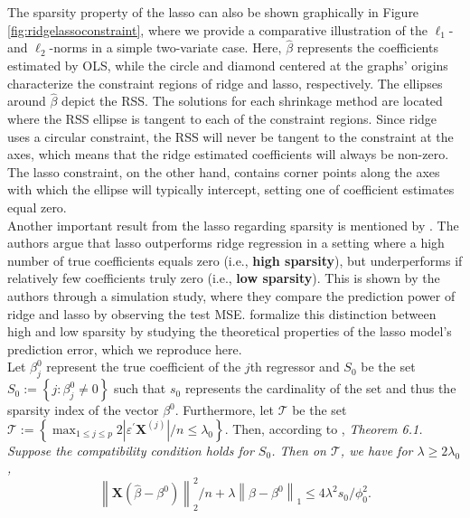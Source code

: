 \noindent The sparsity property of the lasso can also be shown graphically in Figure \ref{fig:ridgelassoconstraint}, where we provide a comparative illustration of the $\ell_1$- and $\ell_2$-norms in a simple two-variate case. Here, $\hat{\beta}$ represents the coefficients estimated by OLS, while the circle and diamond centered at the graphs' origins characterize the constraint regions of ridge and lasso, respectively. The ellipses around $\hat{\beta}$ depict the RSS. The solutions for each shrinkage method are located where the RSS ellipse is tangent to each of the constraint regions. Since ridge uses a circular constraint, the RSS will never be tangent to the constraint at the axes, which means that the ridge estimated coefficients will always be non-zero. The lasso constraint, on the other hand, contains corner points along the axes with which the ellipse will typically intercept, setting one of coefficient estimates equal zero. \\

\noindent Another important result from the lasso regarding sparsity is mentioned by \cite{james2013introduction}. The authors argue that lasso outperforms ridge regression in a setting where a high number of true coefficients equals zero (i.e., \textbf{high sparsity}), but underperforms if relatively few coefficients truly zero (i.e., \textbf{low sparsity}). This is shown by the authors through a simulation study, where they compare the prediction power of ridge and lasso by observing the test MSE. \cite{buhlmann2011statistics} formalize this distinction between high and low sparsity by studying the theoretical properties of the lasso model's prediction error, which we reproduce here. \\

\noindent Let $\beta_j^0$ represent the true coefficient of the $j$th regressor and $S_0$ be the set $S_{0}:=\left\{j: \beta_{j}^{0} \neq 0\right\}$ such that $s_0$ represents the cardinality of the set and thus the sparsity index of the vector $\beta^0$. Furthermore, let $\mathscr{T}$ be the set $\mathscr{T}:=\left\{\max _{1 \leq j \leq p} 2\left|\varepsilon^{\prime} \mathbf{X}^{(j)}\right| / n \leq \lambda_{0}\right\}$. Then, according to  \cite{buhlmann2011statistics}, \textit{Theorem 6.1. Suppose the compatibility condition holds for $S_{0}$. Then on $\mathscr{T}$, we have for $\lambda \geq 2 \lambda_{0}$,
$$
\left\|\mathbf{X}\left(\hat{\beta}-\beta^{0}\right)\right\|_{2}^{2} / n+\lambda\left\|\hat{\beta}-\beta^{0}\right\|_{1} \leq 4 \lambda^{2} s_{0} / \phi_{0}^{2}.
$$}

